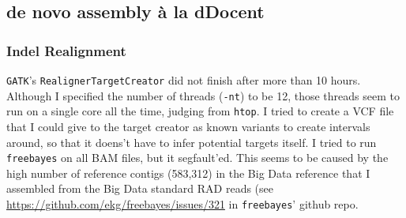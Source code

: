 \documentclass{article}\usepackage[]{graphicx}\usepackage[]{color}
\begin{document}
\subsection{de novo assembly \`{a} la dDocent}

\subsubsection{Indel Realignment}
\texttt{GATK}'s \texttt{RealignerTargetCreator} did not finish after more than 10 hours. Although I specified the number of threads (\texttt{-nt}) to be 12, those threads seem to run on a single core all the time, judging from \texttt{htop}. I tried to create a VCF file that I could give to the target creator as known variants to create intervals around, so that it doens't have to infer potential targets itself. I tried to run \texttt{freebayes} on all BAM files, but it segfault'ed. This seems to be caused by the high number of reference contigs (583,312) in the Big Data reference that I assembled from the Big Data standard RAD reads (see \href{issue #321}{https://github.com/ekg/freebayes/issues/321} in \texttt{freebayes}' github repo.

\end{document}
